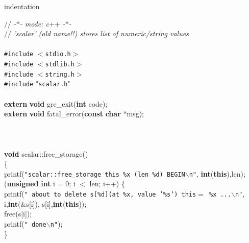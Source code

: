 %
%
\setlength{\textwidth}{15cm}
\setlength{\textheight}{22.5cm}
\setlength{\hoffset}{-2cm}
\setlength{\voffset}{-2cm}

\expandafter\ifx\csname indentation\endcsname\relax%
\newlength{\indentation}\fi
\setlength{\indentation}{0.5em}
\begin{flushleft}
{$//$\it{} -$\ast$- mode: c$+$$+$ -$\ast$-{}\mbox{}\\
}{$//$\it{} 'scalar' (old name!!) stores list of numeric/string values{}\mbox{}\\
}\mbox{}\\
{\tt \#include} $<${\tt{}stdio.h}$>$\mbox{}\\
{\tt \#include} $<${\tt{}stdlib.h}$>$\mbox{}\\
{\tt \#include} $<${\tt{}string.h}$>$\mbox{}\\
{\tt \#include} "{\tt{}scalar.h}"\mbox{}\\
\mbox{}\\
{\bf extern} {\bf void} gre\_exit({\bf int} code);\mbox{}\\
{\bf extern} {\bf void} fatal\_error({\bf const} {\bf char} $\ast$msg);\mbox{}\\
\mbox{}\\
\mbox{}\\
\mbox{}\\
{\bf void} scalar::free\_storage()\mbox{}\\
\{\mbox{}\\
\hspace*{4\indentation}printf({\tt"scalar::free\_storage this \%x (len \%d) BEGIN$\backslash$n"}, {\bf int}({\bf this}),len);\mbox{}\\
\hspace*{4\indentation}{\bf for} ({\bf unsigned} {\bf int} i = 0; i $<$ len; i++) \{\mbox{}\\
\hspace*{8\indentation}printf({\tt"    about to delete s[\%d](at \%x, value '\%s') this$=$ \%x ...$\backslash$n"}, i,{\bf int}(\&s[i]), s[i],{\bf int}({\bf this}));\mbox{}\\
\hspace*{8\indentation}free(s[i]);\mbox{}\\
\hspace*{8\indentation}printf({\tt"        done$\backslash$n"});\mbox{}\\
\hspace*{4\indentation}\}\mbox{}\\

\end{flushleft}
